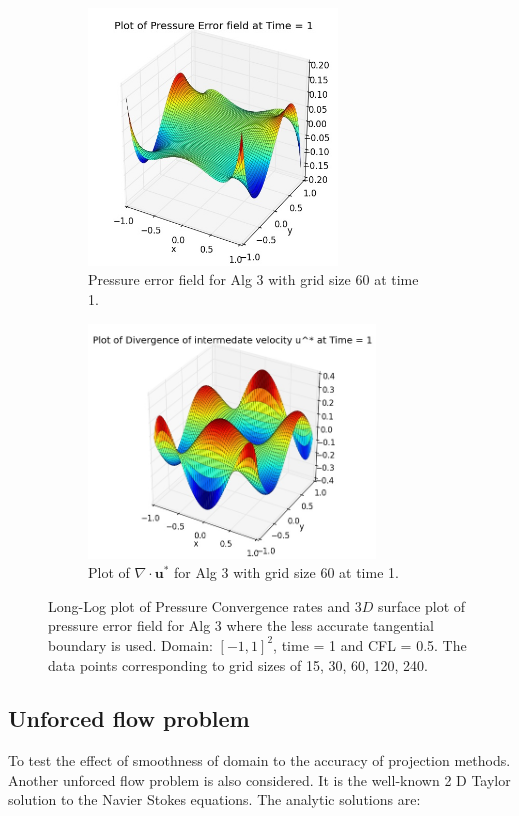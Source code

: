 \begin{figure}[H]
	\begin{subfigure}[t]{2.6in}
		\centering
		\includegraphics[width=2.6in]{figures/Pm2D_pf2_np_P_error_t_1_grid_60.jpg}
		\caption{Pressure error field for Alg 3 with grid size 60 at time 1. }\label{fig:6.13a}
	\end{subfigure}
	\begin{subfigure}[t]{3.0in}
		\centering
		\includegraphics[width=3.0in]{figures/Pm2D_pf2_np_div_uvstar_t_1_grid_60.jpg}
		\caption{Plot of $\nabla \cdot \textbf{u}^*$ for Alg 3 with grid size 60 at time 1. }\label{fig:6.13b}
	\end{subfigure}
	\caption{Long-Log plot of Pressure Convergence rates and $3D$ surface plot of pressure error field for Alg 3 where the less accurate tangential boundary is used. Domain: $[-1,1]^2$, time = 1 and CFL = 0.5. The data points corresponding to grid sizes of 15, 30, 60, 120, 240.}\label{fig:6.13}
\end{figure}

\newpage
\subsection{Unforced flow problem}

To test the effect of smoothness of domain to the accuracy of projection methods. Another unforced flow problem is also considered. It is the well-known 2 D Taylor solution to the Navier Stokes equations. The analytic solutions are:

